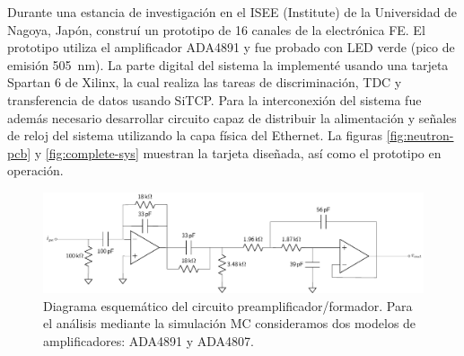 Durante una estancia de investigación en el ISEE (Institute) de la Universidad de Nagoya, Japón, construí un prototipo de \num{16} canales de la electrónica FE. El prototipo utiliza el amplificador ADA4891 y fue probado con LED verde (pico de emisión \SI{505}{\nano\metre}). La parte digital del sistema la implementé usando una tarjeta Spartan \num{6} de Xilinx, la cual realiza las tareas de discriminación, TDC y transferencia de datos usando SiTCP. Para la interconexión del sistema fue además necesario desarrollar circuito capaz de distribuir la alimentación y señales de reloj del sistema utilizando la capa física del Ethernet. La figuras \ref{fig:neutron-pcb} y \ref{fig:complete-sys} muestran la tarjeta diseñada, así como el prototipo en operación.

\begin{figure}
        \centering
        \includegraphics[width=\textwidth]{preamp-shaper-final.pdf}
        \caption{Diagrama esquemático del circuito preamplificador/formador. Para el análisis mediante la simulación MC consideramos dos modelos de amplificadores: ADA4891 y ADA4807.}
        \label{fig:preamp-shaper}
\end{figure}

